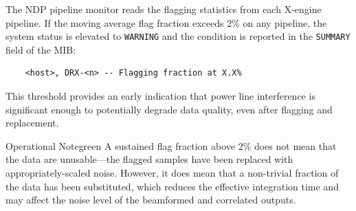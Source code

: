 The NDP pipeline monitor reads the flagging statistics from each X-engine pipeline. If the moving average flag fraction exceeds 2\% on any pipeline, the system status is elevated to \texttt{WARNING} and the condition is reported in the \texttt{SUMMARY} field of the MIB:

\begin{verbatim}
    <host>, DRX-<n> -- Flagging fraction at X.X%
\end{verbatim}

\noindent This threshold provides an early indication that power line interference is significant enough to potentially degrade data quality, even after flagging and replacement.

\begin{calloutBox}{Operational Note}{green}
A sustained flag fraction above 2\% does not mean that the data are unusable---the flagged samples have been replaced with appropriately-scaled noise. However, it does mean that a non-trivial fraction of the data has been substituted, which reduces the effective integration time and may affect the noise level of the beamformed and correlated outputs.
\end{calloutBox}
